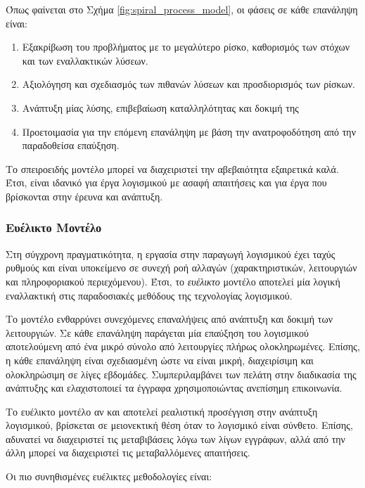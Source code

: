 Όπως φαίνεται στο Σχήμα \ref{fig:spiral_process_model}, οι φάσεις σε κάθε επανάληψη είναι:
\begin{enumerate}
    \item Εξακρίβωση του προβλήματος με το μεγαλύτερο ρίσκο, καθορισμός των στόχων και των εναλλακτικών λύσεων.
    \item Αξιολόγηση και σχεδιασμός των πιθανών λύσεων και προσδιορισμός των ρίσκων.
    \item Ανάπτυξη μίας λύσης, επιβεβαίωση καταλληλότητας και δοκιμή της
    \item Προετοιμασία για την επόμενη επανάληψη με βάση την ανατροφοδότηση από την παραδοθείσα επαύξηση.
\end{enumerate}

Το σπειροειδής μοντέλο μπορεί να διαχειριστεί την αβεβαιότητα εξαιρετικά καλά. Έτσι, είναι ιδανικό για έργα λογισμικού με ασαφή απαιτήσεις και για έργα που βρίσκονται στην έρευνα και ανάπτυξη.

\subsubsection{Ευέλικτο Μοντέλο}
Στη σύγχρονη πραγματικότητα, η εργασία στην παραγωγή λογισμικού έχει ταχύς ρυθμούς και είναι υποκείμενο σε συνεχή ροή αλλαγών (χαρακτηριστικών, λειτουργιών και πληροφοριακού περιεχόμενου). Έτσι, το \textsl{ευέλικτο} μοντέλο αποτελεί μία λογική εναλλακτική στις παραδοσιακές μεθόδους της τεχνολογίας λογισμικού. 

Το μοντέλο ενθαρρύνει συνεχόμενες επαναλήψεις από ανάπτυξη και δοκιμή των λειτουργιών. Σε κάθε επανάληψη παράγεται μία επαύξηση του λογισμικού αποτελούμενη από ένα μικρό σύνολο από λειτουργίες πλήρως ολοκληρωμένες. Επίσης, η κάθε επανάληψη είναι σχεδιασμένη ώστε να είναι μικρή, διαχειρίσιμη και ολοκληρώσιμη σε λίγες εβδομάδες. Συμπεριλαμβάνει των πελάτη στην διαδικασία της ανάπτυξης και ελαχιστοποιεί τα έγγραφα χρησιμοποιώντας ανεπίσημη επικοινωνία.

Το ευέλικτο μοντέλο αν και αποτελεί ρεαλιστική προσέγγιση στην ανάπτυξη λογισμικού, βρίσκεται σε μειονεκτική θέση όταν το λογισμικό είναι σύνθετο. Επίσης, αδυνατεί να διαχειριστεί τις μεταβιβάσεις λόγω των λίγων εγγράφων, αλλά από την άλλη μπορεί να διαχειριστεί τις μεταβαλλόμενες απαιτήσεις.

Οι πιο συνηθισμένες ευέλικτες μεθοδολογίες είναι:

